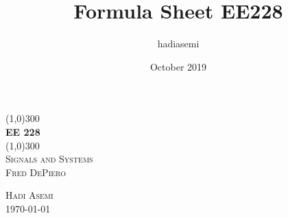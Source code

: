 \documentclass[13pt,a4paper]{article}
\title{Formula Sheet EE228}
\author{hadiasemi }
\date{October 2019}
\begin{document}
\begin{titlepage}
	\begin{center}
		\line(1,0){300}\\
		[0.25in]
		\huge{\bfseries EE 228}\\
		[2mm]
		\line(1,0){300}\\
		[1.5cm]
		\textsc{\LARGE Signals and Systems}\\
		[1.5cm]
		\textsc{\Large Fred DePiero}\\
		[14cm]
		
	\end{center}
	\begin{flushright}
		\textsc{\large Hadi Asemi\\
	    	\today\\}
	\end{flushright}
\end{titlepage}
	
\cleardoublepage
\tableofcontents
\thispagestyle{empty}
\cleardoublepage
\setcounter{page}{1}



 

\setcounter{section}{0}
\setcounter{subsection}{1}
\end{document}
